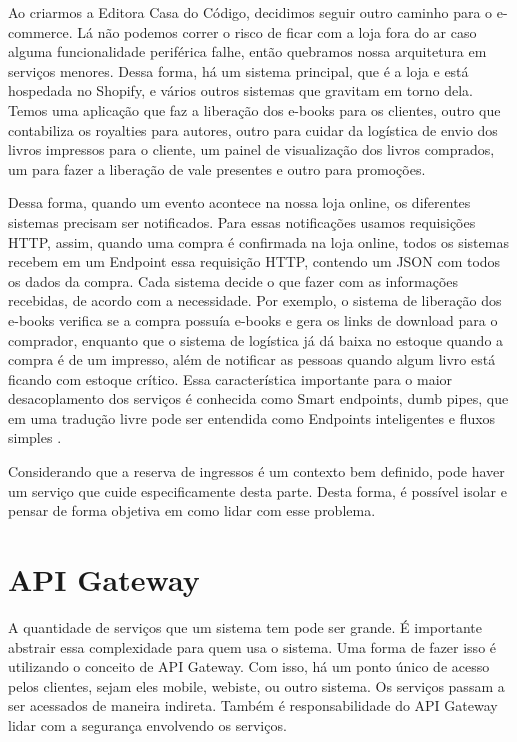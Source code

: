 \begin{citacao}

Ao criarmos a Editora Casa do Código, decidimos seguir outro caminho para o e-commerce.
Lá não podemos correr o risco de ficar com a loja fora do ar caso alguma funcionalidade
periférica falhe, então quebramos nossa arquitetura em serviços menores. Dessa forma, há
um sistema principal, que é a loja e está hospedada no Shopify, e vários outros sistemas
que gravitam em torno dela. Temos uma aplicação que faz a liberação dos e-books para os
clientes, outro que contabiliza os royalties para autores, outro para cuidar da logística
de envio dos livros impressos para o cliente, um painel de visualização dos livros comprados,
um para fazer a liberação de vale presentes e outro para promoções.

Dessa forma, quando um evento acontece na nossa loja online, os diferentes sistemas precisam
ser notificados. Para essas notificações usamos requisições HTTP, assim, quando uma compra
é confirmada na loja online, todos os sistemas recebem em um Endpoint essa requisição HTTP,
contendo um JSON com todos os dados da compra. Cada sistema decide o que fazer com as informações
recebidas, de acordo com a necessidade. Por exemplo, o sistema de liberação dos e-books verifica
se a compra possuía e-books e gera os links de download para o comprador, enquanto que o sistema
de logística já dá baixa no estoque quando a compra é de um impresso, além de notificar as pessoas
quando algum livro está ficando com estoque crítico. Essa característica importante para o maior
desacoplamento dos serviços é conhecida como Smart endpoints, dumb pipes, que em uma tradução
livre pode ser entendida como Endpoints inteligentes e fluxos
simples \cite{arquitetura-de-microservicos-ou-monolitica}.

\end{citacao}


Considerando que a reserva de ingressos é um contexto bem definido, pode haver um serviço que cuide
especificamente desta parte. Desta forma, é possível isolar e pensar de forma objetiva em como
lidar com esse problema.

\section{API Gateway}\label{api-gateway}

A quantidade de serviços que um sistema tem pode ser grande.
É importante abstrair essa complexidade para quem usa o sistema.
Uma forma de fazer isso é utilizando o conceito de API Gateway.
Com isso, há um ponto único de acesso pelos clientes, sejam eles
mobile, webiste, ou outro sistema.
Os serviços passam a ser acessados de maneira indireta.
Também é responsabilidade do API Gateway lidar com a segurança
envolvendo os serviços.

